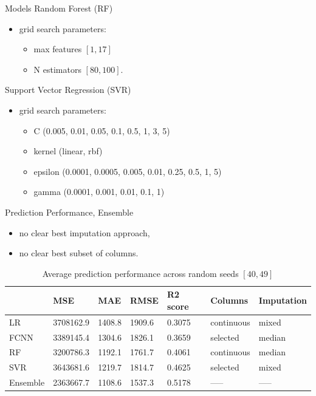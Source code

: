 \documentclass[xcolor=table]{beamer} %
\begin{document}
\begin{frame}{Models}
  \vspace{-0.5cm}
  Random Forest (RF)
  \begin{itemize}
      \item grid search parameters:\\
      \begin{itemize}
      	\footnotesize
      	\item max features $[1, 17]$\\
      	\item N estimators $[80, 100]$.
  	\end{itemize}
  \end{itemize}
  Support Vector Regression (SVR)
  \begin{itemize}
      \item grid search parameters:\\
      \begin{itemize}
      	\footnotesize
        \item C (0.005, 0.01, 0.05, 0.1, 0.5, 1, 3, 5)\\
      	\item kernel (linear, rbf)\\
      	\item epsilon (0.0001, 0.0005, 0.005, 0.01, 0.25, 0.5, 1, 5)\\
      	\item gamma (0.0001, 0.001, 0.01, 0.1, 1)
      \end{itemize}
  \end{itemize}
\end{frame}

\begin{frame}{Prediction Performance, Ensemble}
\vspace{-1cm}
\begin{itemize}
    \item no clear best imputation approach,
    \item no clear best subset of columns.
\end{itemize}
\begin{table}[ht!]
\captionsetup{font=scriptsize}
\scriptsize
    \hspace{-0.7cm}
    \begin{tabular}{l|l|l|l|l|l|l}
                 & MSE        & MAE     & RMSE    & R2 score & Columns & Imputation\\
        \hline
        LR       & 3708162.9 & 1408.8 & 1909.6 & 0.3075 & continuous & mixed \\
        FCNN     & 3389145.4 & 1304.6 & 1826.1 & 0.3659 & selected & median \\
        RF       & 3200786.3 & 1192.1 & 1761.7 & 0.4061 & continuous & median \\
        SVR      & 3643681.6 & 1219.7 & 1814.7  & 0.4625 & selected & mixed \\
        \hline
        Ensemble & 2363667.7 & 1108.6 & 1537.3  & 0.5178 & ----- & ----- \\
    \end{tabular}
    \small
    \caption{Average prediction performance across random seeds $[40, 49]$}
    \label{tab:pred_perf}
\end{table}
\end{frame}
\end{document}
